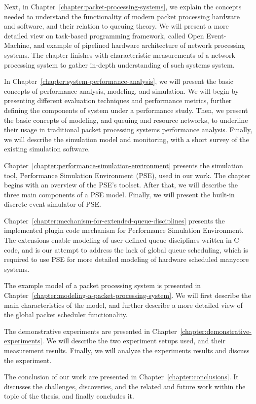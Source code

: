 Next, in Chapter~\ref{chapter:packet-processing-systems}, we explain the concepts needed to understand the functionality of modern packet processing hardware and software, and their relation to queuing theory. We will present a more detailed view on task-based programming framework, called Open Event-Machine, and example of pipelined hardware architecture of network processing systems. The chapter finishes with characteristic measurements of a network processing system to gather in-depth understanding of such systems system.

In Chapter~\ref{chapter:system-performance-analysis}, we will present the basic concepts of performance analysis, modeling, and simulation. We will begin by presenting different evaluation techniques and performance metrics, further defining the components of system under a performance study. Then, we present the basic concepts of modeling, and queuing and resource networks, to underline their usage in traditional packet processing systems performance analysis. Finally, we will describe the simulation model and monitoring, with a short survey of the existing simulation software.

Chapter~\ref{chapter:performance-simulation-environment} presents the simulation tool, Performance Simulation Environment (PSE), used in our work. The chapter begins with an overview of the PSE's toolset. After that, we will describe the three main components of a PSE model. Finally, we will present the built-in discrete event simulator of PSE.

Chapter~\ref{chapter:mechanism-for-extended-queue-disciplines} presents the implemented plugin code mechanism for Performance Simulation Environment. The extensions enable modeling of user-defined queue disciplines written in C-code, and is our attempt to address the lack of global queue scheduling, which is required to use PSE for more detailed modeling of hardware scheduled manycore systems.

The example model of a packet processing system is presented in Chapter~\ref{chapter:modeling-a-packet-processing-system}. We will first describe the main characteristics of the model, and further describe a more detailed view of the global packet scheduler functionality.

The demonstrative experiments are presented in Chapter~\ref{chapter:demonstrative-experiments}. We will describe the two experiment setups used, and their measurement results. Finally, we will analyze the experiments results and discuss the experiment.

The conclusion of our work are presented in Chapter~\ref{chapter:conclusions}. It discusses the challenges, discoveries, and the related and future work within the topic of the thesis, and finally concludes it.

